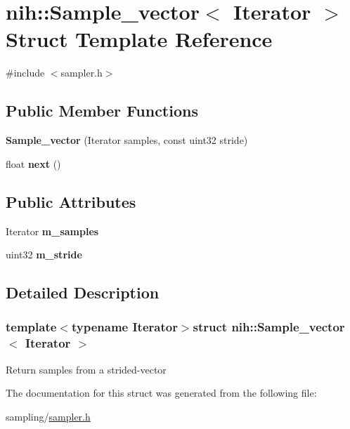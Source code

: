\hypertarget{structnih_1_1_sample__vector}{
\section{nih\-:\-:\-Sample\-\_\-vector$<$ \-Iterator $>$ \-Struct \-Template \-Reference}
\label{structnih_1_1_sample__vector}
}


{\ttfamily \#include $<$sampler.\-h$>$}

\subsection*{\-Public \-Member \-Functions}
\begin{DoxyCompactItemize}
\item 
\hypertarget{structnih_1_1_sample__vector_ad0270af6641d36a8f98cf82d0176afdc}{
{\bfseries \-Sample\-\_\-vector} (\-Iterator samples, const uint32 stride)}
\label{structnih_1_1_sample__vector_ad0270af6641d36a8f98cf82d0176afdc}

\item 
\hypertarget{structnih_1_1_sample__vector_ae27a7bfd068b46892fa1aac7edd54e74}{
float {\bfseries next} ()}
\label{structnih_1_1_sample__vector_ae27a7bfd068b46892fa1aac7edd54e74}

\end{DoxyCompactItemize}
\subsection*{\-Public \-Attributes}
\begin{DoxyCompactItemize}
\item 
\hypertarget{structnih_1_1_sample__vector_af8f75c9125bdc11c898c38b3baf3bdce}{
\-Iterator {\bfseries m\-\_\-samples}}
\label{structnih_1_1_sample__vector_af8f75c9125bdc11c898c38b3baf3bdce}

\item 
\hypertarget{structnih_1_1_sample__vector_af678a3ff643eb31beee1fc7309609045}{
uint32 {\bfseries m\-\_\-stride}}
\label{structnih_1_1_sample__vector_af678a3ff643eb31beee1fc7309609045}

\end{DoxyCompactItemize}


\subsection{\-Detailed \-Description}
\subsubsection*{template$<$typename Iterator$>$struct nih\-::\-Sample\-\_\-vector$<$ Iterator $>$}

\-Return samples from a strided-\/vector 

\-The documentation for this struct was generated from the following file\-:\begin{DoxyCompactItemize}
\item 
sampling/\hyperlink{sampler_8h}{sampler.\-h}\end{DoxyCompactItemize}
